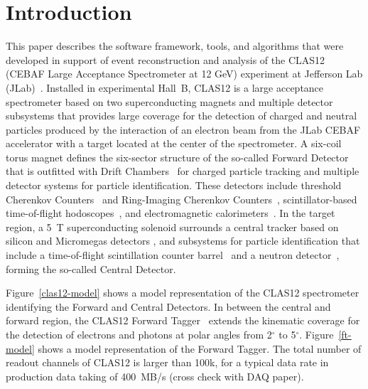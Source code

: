 \section{Introduction}

This paper describes the software framework, tools, and algorithms that were developed in support of event
reconstruction and analysis of the CLAS12 (CEBAF Large Acceptance Spectrometer at 12 GeV) experiment at
Jefferson Lab (JLab)~\cite{clas12-nim}. Installed in experimental Hall~B, CLAS12 is a large acceptance
spectrometer based on two superconducting magnets and multiple detector subsystems that provides large
coverage for the detection of charged and neutral particles produced by the interaction of an electron beam
from the JLab CEBAF accelerator with a target located at the center of the spectrometer. A six-coil torus
magnet defines the six-sector structure of the so-called Forward Detector that is outfitted with Drift
Chambers~\cite{dc-nim} for charged particle tracking and multiple detector systems for particle identification.
These detectors include threshold Cherenkov Counters~\cite{ltcc-nim,htcc-nim} and Ring-Imaging Cherenkov
Counters~\cite{rich-nim}, scintillator-based time-of-flight hodoscopes~\cite{ftof-nim}, and electromagnetic
calorimeters~\cite{ecal-nim}. In the target region, a 5~T superconducting solenoid surrounds a central tracker
based on silicon and Micromegas detectors \cite{svt-nim,mm-nim}, and subsystems for particle identification
that include a time-of-flight scintillation counter barrel~\cite{ctof-nim} and a neutron detector~\cite{cnd-nim},
forming the so-called Central Detector.

Figure~\ref{clas12-model} shows a model representation of the CLAS12 spectrometer identifying the Forward
and Central Detectors. In between the central and forward region, the CLAS12 Forward Tagger~\cite{ft-nim}
extends the kinematic coverage for the detection of electrons and photons at polar angles from 2$^\circ$ to
5$^\circ$. Figure~\ref{ft-model} shows a model representation of the Forward Tagger. The total number of
readout channels of CLAS12 is larger than 100k, for a typical data rate in production data taking of 400~MB/s
(cross check with DAQ paper).  

